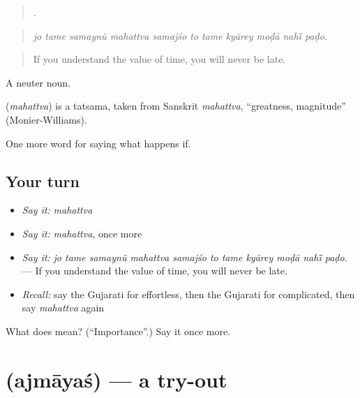\begin{quote}
          .
\end{quote}

\begin{quote}
\emph{jo tame samaynũ mahattva samajśo to tame kyārey moḍā nahī̃ paḍo.}
\end{quote}

\begin{quote}
If you understand the value of time, you will never be late.
\end{quote}

A neuter noun.

\begin{cousinweb}
\textbf{} (\emph{mahattva}) is a tatsama, taken from Sanskrit \emph{mahattva}, \textquotedblleft{}greatness, magnitude\textquotedblright{} (Monier-Williams).
\end{cousinweb}

\begin{grammarlens}[title={What you've built}]
One more word for saying what happens if.
\end{grammarlens}

\subsection*{Your turn}
\begin{itemize}
\raggedright
  \item \emph{Say it:} \emph{mahattva}
  \item \emph{Say it:} \emph{mahattva}, once more
  \item \emph{Say it:} \emph{jo tame samaynũ mahattva samajśo to tame kyārey moḍā nahī̃ paḍo.} — If you understand the value of time, you will never be late.
  \item \emph{Recall:} say the Gujarati for effortless, then the Gujarati for complicated, then say \emph{mahattva} again
\end{itemize}

\begin{tcolorbox}[breakable,colback=teal!4,colframe=teal!35!black,title={Before you move on}]
What does  mean? (\textquotedblleft{}Importance\textquotedblright{}.) Say it once more.
\end{tcolorbox}
\section[\texorpdfstring{\gu{અજમાયશ} (ajmāyaś)}{અજમાયશ (ajmāyaś)}]{ (ajmāyaś) — a try-out}


